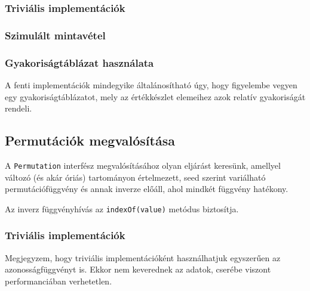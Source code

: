 \documentclass[
    parspace,
    noindent,
    nohyp,
]{elteiktdk}[2023/04/10]
\begin{document}
\subsubsection{Triviális implementációk}



\subsubsection{Szimulált mintavétel}



\subsubsection{Gyakoriságtáblázat használata}

A fenti implementációk mindegyike általánosítható úgy, hogy figyelembe vegyen egy gyakoriságtáblázatot,
mely az értékkészlet elemeihez azok relatív gyakoriságát rendeli.


\subsection{Permutációk megvalósítása}

A \texttt{Permutation} interfész megvalósításához olyan eljárást keresünk, amellyel változó (és akár óriás) tartományon értelmezett,
seed szerint variálható permutációfüggvény és annak inverze előáll, ahol mindkét függvény hatékony.

Az inverz függvényhívás az \texttt{indexOf(value)} metódus biztosítja.

\subsubsection{Triviális implementációk}

Megjegyzem, hogy triviális implementációként használhatjuk egyszerűen az azonosságfüggvényt is.
Ekkor nem keverednek az adatok, cserébe viszont performanciában verhetetlen.
\end{document}
